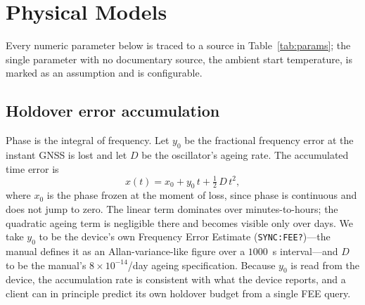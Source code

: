 \documentclass[conference]{IEEEtran}
\begin{document}
\section{Physical Models}
\label{sec:models}
Every numeric parameter below is traced to a source in
Table~\ref{tab:params}; the single parameter with no documentary source,
the ambient start temperature, is marked as an assumption and is
configurable.

\subsection{Holdover error accumulation}
Phase is the integral of frequency. Let $y_0$ be the fractional
frequency error at the instant GNSS is lost and let $D$ be the
oscillator's ageing rate. The accumulated time error is
\begin{equation}
x(t) = x_0 + y_0\,t + \tfrac{1}{2}\,D\,t^{2},
\label{eq:holdover}
\end{equation}
where $x_0$ is the phase frozen at the moment of loss, since phase is
continuous and does not jump to zero. The linear term dominates over
minutes-to-hours; the quadratic ageing term is negligible there and
becomes visible only over days. We take $y_0$ to be the device's own
Frequency Error Estimate (\texttt{SYNC:FEE?})---the manual defines it as
an Allan-variance-like figure over a $1000$~s interval---and $D$ to be
the manual's $8\times10^{-14}$/day ageing specification. Because $y_0$
is read from the device, the accumulation rate is consistent with what
the device reports, and a client can in principle predict its own
holdover budget from a single FEE query.
\end{document}
